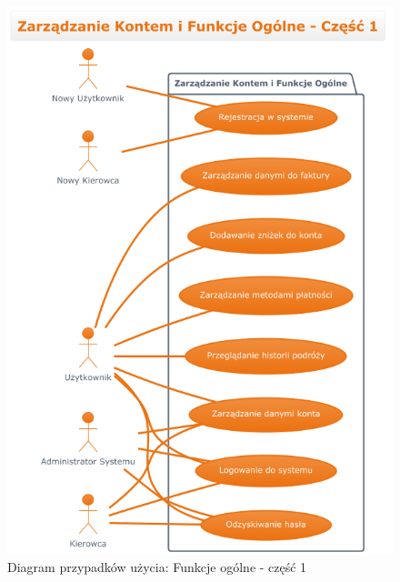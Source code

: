 \documentclass[a4paper,12pt]{article}
\begin{document}
\begin{figure}[H]
    \centering
    \includegraphics[width=0.8\linewidth]{diagramy/przypadki_uzycia/images/diagram_zarzadzanie_kontem_1.png}
    \caption{Diagram przypadków użycia: Funkcje ogólne - część 1}
    \label{fig:diag_zk_1}
\end{figure}
\end{document}
